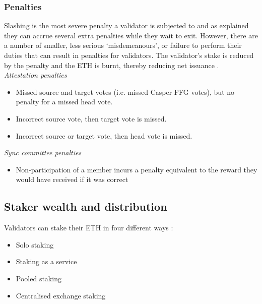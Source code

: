 \documentclass[UTF8]{article}
\begin{document}
{\subsubsection*{Penalties}
Slashing is the most severe penalty a validator is subjected to and as explained they can accrue several extra penalties while they wait to exit. However, there are a number of smaller, less serious `misdemeanours', or failure to perform their duties that can result in penalties for validators. The validator's stake is reduced by the penalty and the ETH is burnt, thereby reducing net issuance \cite{Edgington2023}. \\

\textit{Attestation penalties}
\begin{itemize}
\item Missed source and target votes (i.e. missed Casper FFG votes), but no penalty for a missed head vote.
\item Incorrect source vote, then target vote is missed.
\item Incorrect source or target vote, then head vote is missed.
\end{itemize}

\textit{Sync committee penalties}
\begin{itemize}
\item Non-participation of a member incurs a penalty equivalent to the reward they would have received if it was correct
\end{itemize}

\subsection{Staker wealth and distribution}
Validators can stake their ETH in four different ways \cite{breslina}:
\begin{itemize}
\item Solo staking 
\item Staking as a service
\item Pooled staking
\item Centralised exchange staking
\end{itemize}

}
\end{document}

